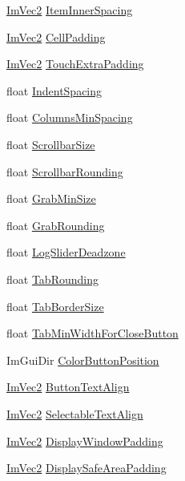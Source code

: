 \begin{DoxyCompactItemize}
\hyperlink{structImVec2}{Im\+Vec2} \hyperlink{structImGuiStyle_a1a12021be99583fb491cff2df75d1ae1}{Item\+Inner\+Spacing}
\item 
\hyperlink{structImVec2}{Im\+Vec2} \hyperlink{structImGuiStyle_aada9069c237335c78e2efadca98c74ca}{Cell\+Padding}
\item 
\hyperlink{structImVec2}{Im\+Vec2} \hyperlink{structImGuiStyle_ab518a0a67df8f14765acc491d7b460f4}{Touch\+Extra\+Padding}
\item 
float \hyperlink{structImGuiStyle_a32ea292dee2b4e178a227acacd061921}{Indent\+Spacing}
\item 
float \hyperlink{structImGuiStyle_a8fed04481e1d75bb95c97819f545e2ba}{Columns\+Min\+Spacing}
\item 
float \hyperlink{structImGuiStyle_a96623380e624d2f2ec207449e700a226}{Scrollbar\+Size}
\item 
float \hyperlink{structImGuiStyle_a00efbadb1ad7daa0ee7384864b147d71}{Scrollbar\+Rounding}
\item 
float \hyperlink{structImGuiStyle_a04db033d001b343815cdcd2491576ef7}{Grab\+Min\+Size}
\item 
float \hyperlink{structImGuiStyle_a42369d83032545066803a7db62936e8f}{Grab\+Rounding}
\item 
float \hyperlink{structImGuiStyle_a6c8674e8aa93236717b36110d7b1f1da}{Log\+Slider\+Deadzone}
\item 
float \hyperlink{structImGuiStyle_a22d2fd87b928e639b4d2d1dbbcf805f8}{Tab\+Rounding}
\item 
float \hyperlink{structImGuiStyle_a25858b1cc9234cbb976c934586fc4d88}{Tab\+Border\+Size}
\item 
float \hyperlink{structImGuiStyle_add208c22be44e1453575f5bce33fa24b}{Tab\+Min\+Width\+For\+Close\+Button}
\item 
Im\+Gui\+Dir \hyperlink{structImGuiStyle_a64b5fdd495573fa07a80dc0071e99802}{Color\+Button\+Position}
\item 
\hyperlink{structImVec2}{Im\+Vec2} \hyperlink{structImGuiStyle_a17246b12f4e069229d21808a87f78514}{Button\+Text\+Align}
\item 
\hyperlink{structImVec2}{Im\+Vec2} \hyperlink{structImGuiStyle_af2dc57060ca88884846dadbf455785c9}{Selectable\+Text\+Align}
\item 
\hyperlink{structImVec2}{Im\+Vec2} \hyperlink{structImGuiStyle_ab06d6f0c6c5f36ab0c14688448de66f6}{Display\+Window\+Padding}
\item 
\hyperlink{structImVec2}{Im\+Vec2} \hyperlink{structImGuiStyle_a8dd02a6a031ec8667e76aab1e28755bd}{Display\+Safe\+Area\+Padding}

\end{DoxyCompactItemize}
